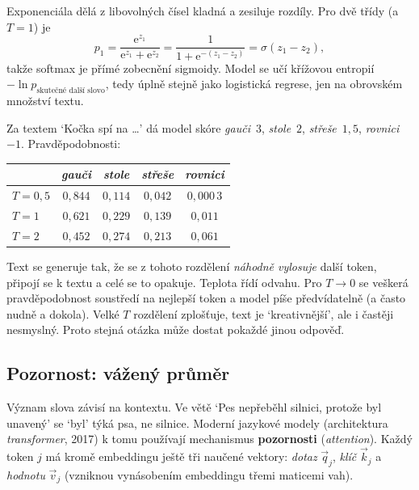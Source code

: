 Exponenciála dělá z libovolných čísel kladná a zesiluje rozdíly. Pro dvě třídy (a $T = 1$) je
\begin{equation*}
  p_1 = \frac{\mathrm{e}^{z_1}}{\mathrm{e}^{z_1} + \mathrm{e}^{z_2}} = \frac{1}{1 + \mathrm{e}^{-(z_1 - z_2)}} = \sigma(z_1 - z_2),
\end{equation*}
takže softmax je přímé zobecnění sigmoidy. Model se učí křížovou entropií $-\ln p_{\text{skutečné další slovo}}$, tedy úplně stejně jako logistická regrese, jen na obrovském množství textu.

\begin{example}
  Za textem `Kočka spí na \dots' dá model skóre \textit{gauči}~$3$, \textit{stole}~$2$, \textit{střeše}~$1{,}5$, \textit{rovnici}~$-1$. Pravděpodobnosti:
  \begin{center}
    \begin{tabular}{lcccc}
      & \textit{gauči} & \textit{stole} & \textit{střeše} & \textit{rovnici}\\\hline
      $T = 0{,}5$ & $0{,}844$ & $0{,}114$ & $0{,}042$ & $0{,}000\,3$\\
      $T = 1$ & $0{,}621$ & $0{,}229$ & $0{,}139$ & $0{,}011$\\
      $T = 2$ & $0{,}452$ & $0{,}274$ & $0{,}213$ & $0{,}061$
    \end{tabular}
  \end{center}
\end{example}

Text se generuje tak, že se z tohoto rozdělení \textit{náhodně vylosuje} další token, připojí se k textu a celé se to opakuje. Teplota řídí odvahu. Pro $T\to 0$ se veškerá pravděpodobnost soustředí na nejlepší token a model píše předvídatelně (a často nudně a dokola). Velké $T$ rozdělení zplošťuje, text je `kreativnější', ale i častěji nesmyslný. Proto stejná otázka může dostat pokaždé jinou odpověď.

\subsection{Pozornost: vážený průměr}

Význam slova závisí na kontextu. Ve větě `Pes nepřeběhl silnici, protože byl unavený' se `byl' týká psa, ne silnice. Moderní jazykové modely (architektura \textit{transformer}, 2017) k tomu používají mechanismus \textbf{pozornosti} (\textit{attention}). Každý token $j$ má kromě embeddingu ještě tři naučené vektory: \textit{dotaz} $\vec{q}_j$, \textit{klíč} $\vec{k}_j$ a \textit{hodnotu} $\vec{v}_j$ (vzniknou vynásobením embeddingu třemi maticemi vah).

